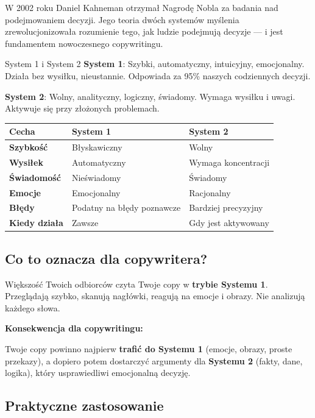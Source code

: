 \documentclass[
  12pt,
  a4paper,
  twoside,
  openright,
  12pt,
  DIV=12,
  BCOR=12mm]{scrbook}
\begin{document}
W 2002 roku Daniel Kahneman otrzymał Nagrodę Nobla za badania nad
podejmowaniem decyzji. Jego teoria dwóch systemów myślenia
zrewolucjonizowała rozumienie tego, jak ludzie podejmują decyzje --- i
jest fundamentem nowoczesnego copywritingu.

\begin{pojecie}{System 1 i System 2}
\textbf{System 1}: Szybki, automatyczny, intuicyjny, emocjonalny. Działa bez wysiłku, nieustannie. Odpowiada za 95\% naszych codziennych decyzji.

\textbf{System 2}: Wolny, analityczny, logiczny, świadomy. Wymaga wysiłku i uwagi. Aktywuje się przy złożonych problemach.
\end{pojecie}

\begin{longtable}[]{@{}lll@{}}
\toprule\noalign{}
Cecha & System 1 & System 2 \\
\midrule\noalign{}
\endhead
\bottomrule\noalign{}
\endlastfoot
\textbf{Szybkość} & Błyskawiczny & Wolny \\
\textbf{Wysiłek} & Automatyczny & Wymaga koncentracji \\
\textbf{Świadomość} & Nieświadomy & Świadomy \\
\textbf{Emocje} & Emocjonalny & Racjonalny \\
\textbf{Błędy} & Podatny na błędy poznawcze & Bardziej precyzyjny \\
\textbf{Kiedy działa} & Zawsze & Gdy jest aktywowany \\
\end{longtable}

\subsection{Co to oznacza dla
copywritera?}\label{co-to-oznacza-dla-copywritera}

Większość Twoich odbiorców czyta Twoje copy w \textbf{trybie Systemu 1}.
Przeglądają szybko, skanują nagłówki, reagują na emocje i obrazy. Nie
analizują każdego słowa.

\begin{wazne}
\textbf{Konsekwencja dla copywritingu:}

Twoje copy powinno najpierw \textbf{trafić do Systemu 1} (emocje, obrazy, proste przekazy), a dopiero potem dostarczyć argumenty dla \textbf{Systemu 2} (fakty, dane, logika), który usprawiedliwi emocjonalną decyzję.
\end{wazne}

\subsection{Praktyczne zastosowanie}\label{praktyczne-zastosowanie}
\end{document}

